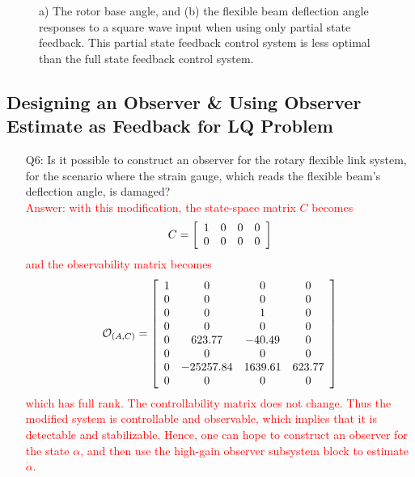 \documentclass[12pt]{report}
\newcommand\drew[1]{\textcolor{red}{#1}}
\begin{document}
\begin{enumerate}
{\begin{figure}[htb!]
                  \caption{a) The rotor base angle, and (b) the flexible beam deflection angle responses to a square wave input when using only partial state feedback. This partial state feedback control system is less optimal than the full state feedback control system.}
              \end{figure}
          }
\end{enumerate}
\newpage

\subsection{Designing an Observer \& Using Observer Estimate as Feedback for LQ Problem}\label{subsection:lab4_observer_lqr}
\begin{enumerate}
    \item[Q6:] Is it possible to construct an observer for the rotary flexible link system, for the scenario where the strain gauge, which reads the flexible beam's deflection angle, is damaged?\\
          \drew{Answer: with this modification, the state-space matrix $C$ becomes
              \[
                  C = \left[\begin{array}{c c c c}
                          1 & 0 & 0 & 0 \\
                          0 & 0 & 0 & 0
                      \end{array}\right]
              \]
              and the observability matrix becomes
              \[
                  \mathcal{O}_{(A,C)} = \left[\begin{array}{c c c c}
                          1 & 0         & 0       & 0      \\
                          0 & 0         & 0       & 0      \\
                          0 & 0         & 1       & 0      \\
                          0 & 0         & 0       & 0      \\
                          0 & 623.77    & -40.49  & 0      \\
                          0 & 0         & 0       & 0      \\
                          0 & -25257.84 & 1639.61 & 623.77 \\
                          0 & 0         & 0       & 0
                      \end{array}\right]
              \]
              which has full rank. The controllability matrix does not change. Thus the modified system is controllable and observable, which implies that it is detectable and stabilizable. Hence, one can hope to construct an observer for the state $\alpha$, and then use the high-gain observer subsystem block to estimate $\dot{\alpha}$.}
\end{enumerate}
\end{document}
